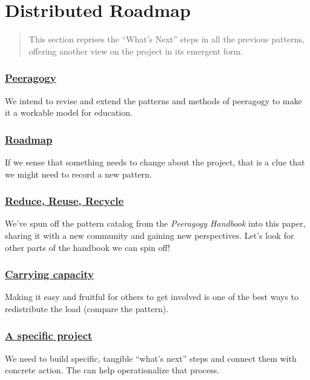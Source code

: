 \section{Distributed Roadmap} \label{sec:Distributed_Roadmap}

\begin{quote}
This section reprises the ``What's Next'' steps in all the previous
patterns, offering another view on the project 
in its emergent form.
\end{quote}

\subsubsection*{\hyperref[sec:Peeragogy_Project]{Peeragogy}} 
 We intend to revise and extend the patterns and methods of peeragogy to make it a workable model for education.

\subsubsection*{\hyperref[sec:Roadmap]{Roadmap}} If we sense that something needs to change about the project, that is a clue that we might need to record a new pattern.

\subsubsection*{\hyperref[sec:Use_or_make]{Reduce, Reuse, Recycle}}
We've spun off the pattern catalog from the \emph{Peeragogy Handbook} into this paper, sharing it with a new community and gaining new perspectives.  Let's look for other parts of the handbook we can spin off!

\subsubsection*{\hyperref[sec:Carrying_capacity]{Carrying capacity}} 
Making it easy and fruitful for others to get involved is one of the best ways to
redistribute the load (compare the
pattern).

\subsubsection*{\hyperref[sec:A_specific_project]{A specific project}}
We need to build specific, tangible ``what's next'' steps and connect them with concrete action. The  can help operationalize that process. 

